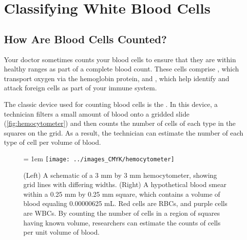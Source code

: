 \chapter[Classifying White Blood Cells]{Classifying White Blood Cells}
\label{chapter:white_blood_cells}
\renewcommand{\chaptertitle}{Classifying White Blood Cells}


\FloatBarrier

\section{How Are Blood Cells Counted?}
\label{sec:introduction}

Your doctor sometimes counts your blood cells to ensure that they are within healthy ranges as part of a complete blood count. These cells comprise , which transport oxygen via the hemoglobin protein, and , which help identify and attack foreign cells as part of your immune system.

The classic device used for counting blood cells is the . In this device, a technician filters a small amount of blood onto a gridded slide (\autoref{fig:hemocytometer}) and then counts the number of cells of each type in the squares on the grid. As a result, the technician can estimate the number of each type of cell per volume of blood.\\

\begin{figure}[h]
\centering
\tabcolsep = 1em
\mySfFamily
\texttt{[image: ../images\_CMYK/hemocytometer]}
\caption{(Left) A schematic of a 3 mm by 3 mm hemocytometer, showing grid lines with differing widths. (Right) A hypothetical blood smear within a 0.25 mm by 0.25 mm square, which contains a volume of blood equaling 0.00000625 mL. Red cells are RBCs, and purple cells are WBCs. By counting the number of cells in a region of squares having known volume, researchers can estimate the counts of cells per unit volume of blood.}
\label{fig:hemocytometer}
\end{figure}

